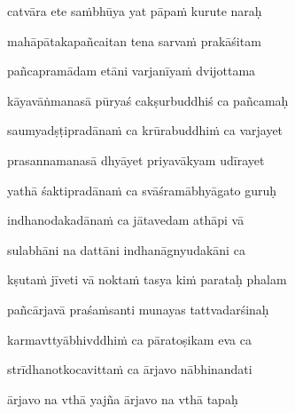 catvāra ete sa\.mbhūya yat pāpa\.m kurute naraḥ \veg\dontdisplaylinenum

mahāpātakapañcaitan tena sarva\.m prakāśitam\thinspace{\dandab} \dontdisplaylinenum

pañcapramādam etāni varjanīya\.m dvijottama \veg\dontdisplaylinenum


kāyavāṅmanasā pūryaś cakṣurbuddhiś ca pañcamaḥ\thinspace{\dandab} \dontdisplaylinenum

saumyadṣṭipradāna\.m ca krūrabuddhi\.m ca varjayet \veg\dontdisplaylinenum

prasannamanasā dhyāyet priyavākyam udīrayet\thinspace{\dandab} \dontdisplaylinenum

yathā śaktipradāna\.m ca svāśramābhyāgato guruḥ \veg\dontdisplaylinenum

indhanodakadāna\.m ca jātavedam athāpi vā\thinspace{\dandab} \dontdisplaylinenum

sulabhāni na dattāni indhanāgnyudakāni ca \veg\dontdisplaylinenum

kṣuta\.m jīveti vā nokta\.m tasya ki\.m parataḥ phalam\thinspace{\dandab} \dontdisplaylinenum


pañcārjavā praśa\.msanti munayas tattvadarśinaḥ \veg\dontdisplaylinenum

karmavttyābhivddhi\.m ca pāratoṣikam eva ca\thinspace{\dandab} \dontdisplaylinenum

strīdhanotkocavitta\.m ca ārjavo nābhinandati \veg\dontdisplaylinenum

ārjavo na vthā yajña ārjavo na vthā tapaḥ\thinspace{\dandab} \dontdisplaylinenum

